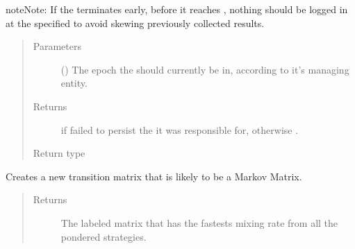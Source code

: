 \documentclass[letterpaper,10pt,english]{sphinxmanual}
\begin{document}
\begin{fulllineitems}
\begin{fulllineitems}
\begin{sphinxadmonition}{note}{Note:}
If the  terminates early, before it reaches
{\hyperref[\detokenize{app.domain:app.domain.master_servers.Master.MAX_EPOCHS}]{}},
nothing should be logged in
{\hyperref[\detokenize{app.domain.helpers:app.domain.helpers.smart_dataclasses.LoggingData}]{}}
at the specified  to avoid skewing previously
collected results.
\end{sphinxadmonition}
\begin{quote}\begin{description}
\item[{Parameters}] \leavevmode
{} () \textendash{} The epoch the  should currently be in, according
to it’s managing  entity.

\item[{Returns}] \leavevmode
{} if  failed to persist the  it
was responsible for, otherwise .

\item[{Return type}] \leavevmode
{}

\end{description}\end{quote}

\end{fulllineitems}


\begin{fulllineitems}
\label{\detokenize{app.domain:app.domain.cluster_groups.SGClusterPerfect.new_transition_matrix}}
Creates a new transition matrix that is likely to be a Markov Matrix.
\begin{quote}\begin{description}
\item[{Returns}] \leavevmode
The labeled matrix that has the fastests mixing rate from all
the pondered strategies.


\end{description}
\end{quote}
\end{fulllineitems}
\end{fulllineitems}
\end{document}
